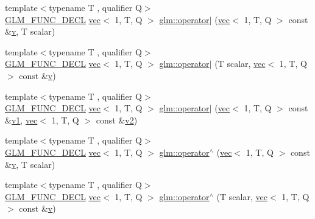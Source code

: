 \begin{DoxyCompactItemize}
\item 
{\footnotesize template$<$typename T , qualifier Q$>$ }\\\hyperlink{setup_8hpp_ab2d052de21a70539923e9bcbf6e83a51}{G\+L\+M\+\_\+\+F\+U\+N\+C\+\_\+\+D\+E\+CL} \hyperlink{structglm_1_1vec}{vec}$<$ 1, T, Q $>$ \hyperlink{group__ext__vec1_ga4cb746ab6c11e1f5228e1468afcc0bfb}{glm\+::operator$\vert$} (\hyperlink{structglm_1_1vec}{vec}$<$ 1, T, Q $>$ const \&\hyperlink{_s_d_l__opengl_8h_a10a82eabcb59d2fcd74acee063775f90}{v}, T scalar)
\item 
{\footnotesize template$<$typename T , qualifier Q$>$ }\\\hyperlink{setup_8hpp_ab2d052de21a70539923e9bcbf6e83a51}{G\+L\+M\+\_\+\+F\+U\+N\+C\+\_\+\+D\+E\+CL} \hyperlink{structglm_1_1vec}{vec}$<$ 1, T, Q $>$ \hyperlink{group__ext__vec1_gaee2907e10f2307c2e36147741400da29}{glm\+::operator$\vert$} (T scalar, \hyperlink{structglm_1_1vec}{vec}$<$ 1, T, Q $>$ const \&\hyperlink{_s_d_l__opengl_8h_a10a82eabcb59d2fcd74acee063775f90}{v})
\item 
{\footnotesize template$<$typename T , qualifier Q$>$ }\\\hyperlink{setup_8hpp_ab2d052de21a70539923e9bcbf6e83a51}{G\+L\+M\+\_\+\+F\+U\+N\+C\+\_\+\+D\+E\+CL} \hyperlink{structglm_1_1vec}{vec}$<$ 1, T, Q $>$ \hyperlink{group__ext__vec1_ga837171e73bbc4fe6d067f275947f1b34}{glm\+::operator$\vert$} (\hyperlink{structglm_1_1vec}{vec}$<$ 1, T, Q $>$ const \&\hyperlink{_s_d_l__opengl__glext_8h_a435c176a02c061b43e19bdf7c86cceae}{v1}, \hyperlink{structglm_1_1vec}{vec}$<$ 1, T, Q $>$ const \&\hyperlink{_s_d_l__opengl__glext_8h_a0928f6d0f0f794ba000a21dfae422136}{v2})
\item 
{\footnotesize template$<$typename T , qualifier Q$>$ }\\\hyperlink{setup_8hpp_ab2d052de21a70539923e9bcbf6e83a51}{G\+L\+M\+\_\+\+F\+U\+N\+C\+\_\+\+D\+E\+CL} \hyperlink{structglm_1_1vec}{vec}$<$ 1, T, Q $>$ \hyperlink{group__ext__vec1_ga5e3dabaa97accd1e6cf3853326605d3e}{glm\+::operator$^\wedge$} (\hyperlink{structglm_1_1vec}{vec}$<$ 1, T, Q $>$ const \&\hyperlink{_s_d_l__opengl_8h_a10a82eabcb59d2fcd74acee063775f90}{v}, T scalar)
\item 
{\footnotesize template$<$typename T , qualifier Q$>$ }\\\hyperlink{setup_8hpp_ab2d052de21a70539923e9bcbf6e83a51}{G\+L\+M\+\_\+\+F\+U\+N\+C\+\_\+\+D\+E\+CL} \hyperlink{structglm_1_1vec}{vec}$<$ 1, T, Q $>$ \hyperlink{group__ext__vec1_gad8d8f5ba70c15af0a21dc1f79c2101b9}{glm\+::operator$^\wedge$} (T scalar, \hyperlink{structglm_1_1vec}{vec}$<$ 1, T, Q $>$ const \&\hyperlink{_s_d_l__opengl_8h_a10a82eabcb59d2fcd74acee063775f90}{v})

\end{DoxyCompactItemize}
